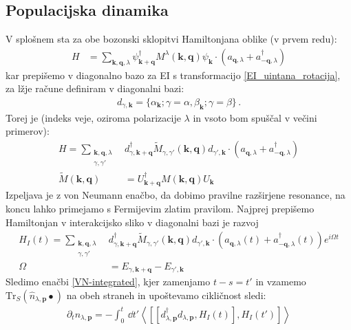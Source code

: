 \documentclass[a4paper,10pt]{article}
\renewcommand{\vec}[1]{\mathbf{#1}}
\begin{document}
\subsection{Populacijska dinamika}
V splošnem sta za obe bozonski sklopitvi Hamiltonjana oblike (v prvem redu): 
\begin{align}
  H &= \sum_{{\mathbf{k}, \mathbf{q}, \lambda}} \psi_{\mathbf{k}+\mathbf{q}}^\dagger {M^{\lambda}(\mathbf{k}, \mathbf{q})} \psi_{\mathbf{k}} \cdot (a_{\mathbf{q},\lambda} + a_{-\mathbf{q},\lambda}^\dagger)
\end{align}
kar prepišemo v diagonalno bazo za EI s transformacijo \eqref{EI_uintana_rotacija}, za lžje račune definiram v diagonalni bazi: 
\begin{align}
  d_{\gamma, \vec k} = \{\alpha_{\vec{k}}; \gamma=\alpha, \beta_{\vec{k}}; \gamma=\beta\}\,.
\end{align} 
Torej je (indeks veje, oziroma polarizacije $\lambda$ in vsoto bom spuščal v večini primerov):
\begin{align}
  H = \sum_{\substack{\mathbf{k}, \mathbf{q}, \lambda \\ \gamma, \gamma'}} &d_{\gamma,\mathbf{k}+\mathbf{q}}^\dagger {\widetilde{M}_{\gamma,\gamma'}(\mathbf{k}, \mathbf{q})} d_{\gamma', \mathbf{k}} \cdot (a_{\mathbf{q},\lambda} + a_{-\mathbf{q},\lambda}^\dagger)  \\[8pt]
  \widetilde{M}(\mathbf{k}, \mathbf{q}) &= U_{\vec k + \vec{q}}^\dagger M(\mathbf{k}, \mathbf{q}) U_{\vec{k}}
\end{align}
Izpeljava je z von Neumann enačbo, da dobimo pravilne razširjene resonance, na koncu lahko primejamo s Fermijevim zlatim pravilom. Najprej prepišemo Hamiltonjan v interakcijsko sliko v diagonalni bazi je razvoj
\begin{align}
  H_I(t) = \sum_{\substack{\mathbf{k}, \mathbf{q}, \lambda \\ \gamma, \gamma'}} &d_{\gamma,\mathbf{k}+\mathbf{q}}^\dagger {\widetilde{M}_{\gamma,\gamma'}(\mathbf{k}, \mathbf{q})} d_{\gamma', \mathbf{k}} \cdot \left(a_{\mathbf{q},\lambda}(t) + a_{-\mathbf{q},\lambda}^\dagger(t)\right) e^{i\Omega t} \\[8pt]
  \Omega &= E_{\gamma, \vec{k} + \vec q} - E_{\gamma', \vec k}
\end{align}
Sledimo enačbi \eqref{VN-integrated}, kjer zamenjamo $t-s=t'$ in vzamemo $\text{Tr}_S(\hat{n}_{\lambda, \vec p} \bullet)$ na obeh straneh in upoštevamo cikličnost sledi:
\begin{align}
  \partial_t n_{\lambda, \vec p} = - \int_0^t \,\dd{t'}\left\langle \left[\left[d_{\lambda,\mathbf{p}}^\dagger d_{\lambda,\mathbf{p}}, H_I(t)\right], H_I(t')\right]\right\rangle
\end{align}
\end{document}
